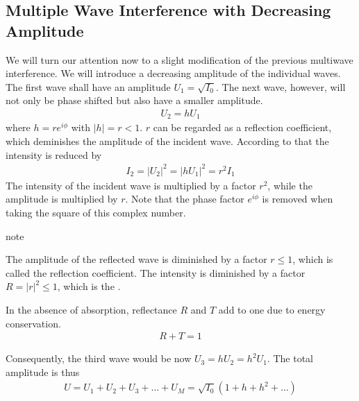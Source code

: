 \documentclass[letterpaper,10pt,english]{sphinxmanual}
\begin{document}
\subsection{Multiple Wave Interference with Decreasing Amplitude}
\label{\detokenize{notebooks/L10/Interference:Multiple-Wave-Interference-with-Decreasing-Amplitude}}
We will turn our attention now to a slight modification of the previous multiwave interference. We will introduce a decreasing amplitude of the individual waves. The first wave shall have an amplitude \(U_1=\sqrt{I_0}\). The next wave, however, will not only be phase shifted but also have a smaller amplitude.
\begin{equation*}
\begin{split}U_2=h U_1\end{split}
\end{equation*}
where \(h=re^{i\phi}\) with \(|h|=r<1\). \(r\) can be regarded as a reflection coefficient, which deminishes the amplitude of the incident wave. According to that the intensity is reduced by
\begin{equation*}
\begin{split}I_2=|U_2|^2=|h U_1|^2=r^2 I_1\end{split}
\end{equation*}
The intensity of the incident wave is multiplied by a factor \(r^2\), while the amplitude is multiplied by \(r\). Note that the phase factor \(e^{i\phi}\) is removed when taking the square of this complex number.

\begin{sphinxadmonition}{note}{}\unskip
{}

The amplitude of the reflected wave is diminished by a factor \(r\le 1\), which is called the reflection coefficient. The intensity is diminished by a factor \(R=|r|^2\le1\), which is the .

In the absence of absorption, reflectance \(R\) and  \(T\) add to one due to energy conservation.
\begin{equation*}
\begin{split}R+T=1\end{split}
\end{equation*}\end{sphinxadmonition}

Consequently, the third wave would be now \(U_3=hU_2=h^2U_1\). The total amplitude is thus
\begin{equation*}
\begin{split}U=U_1+U_2+U_3+\ldots+U_M = \sqrt{I_0}(1+h+h^2+\ldots)\end{split}
\end{equation*}
\end{document}

